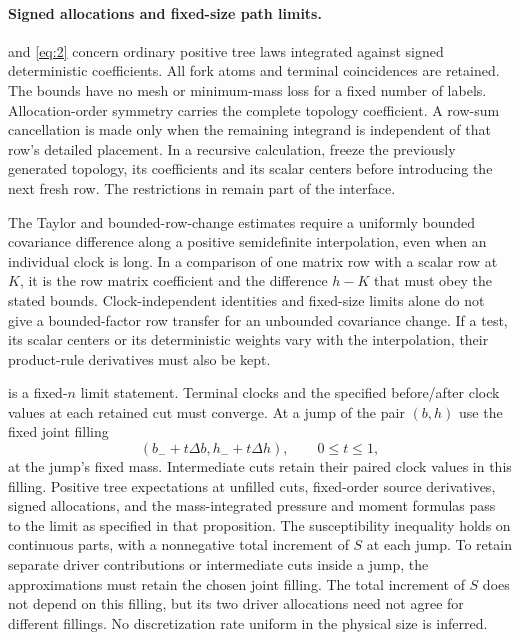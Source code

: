 \paragraph{Signed allocations and fixed-size path limits.}
and \eqref{eq:2} concern ordinary positive tree laws integrated against
signed deterministic coefficients. All fork atoms and terminal
coincidences are retained. The bounds have no mesh or minimum-mass
loss for a fixed number of labels. Allocation-order symmetry carries
the complete topology coefficient. A row-sum cancellation is made only
when the remaining integrand is independent of that row's detailed
placement. In a recursive calculation, freeze the previously generated
topology, its coefficients and its scalar centers before introducing
the next fresh row. The restrictions in
 remain part of
the interface.

The Taylor and bounded-row-change estimates require a uniformly
bounded covariance difference along a positive semidefinite
interpolation, even when an individual clock is long. In a comparison
of one matrix row with a scalar row at $K$, it is the row matrix
coefficient and the difference $h-K$ that must obey the stated bounds.
Clock-independent identities and fixed-size limits alone do not
give a bounded-factor row transfer for an unbounded covariance change.
If a test, its scalar centers or its deterministic weights vary with
the interpolation, their product-rule derivatives must also be kept.

 is a fixed-$n$ limit statement. Terminal clocks
and the specified before/after clock values at each retained cut must
converge. At a jump of the pair $(b,h)$ use the fixed joint filling
\[
 (b_-+t\Delta b,h_-+t\Delta h),\qquad 0\le t\le1,
\]
at the jump's fixed mass. Intermediate cuts retain their paired clock
values in this filling. Positive tree expectations at unfilled cuts,
fixed-order source derivatives, signed allocations, and the
mass-integrated pressure and moment formulas pass to the limit as
specified in that proposition. The susceptibility inequality holds
on continuous parts, with a nonnegative total increment of $S$ at
each jump. To retain separate driver contributions or intermediate
cuts inside a jump, the approximations must retain the chosen joint
filling. The total increment of $S$ does not depend on this filling,
but its two driver allocations need not agree for different fillings.
No discretization rate uniform in the physical size is inferred.

